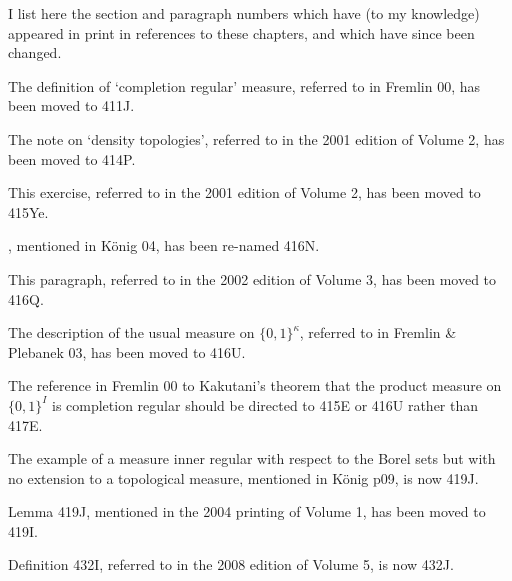      
\def\chaptername{Topologies and measures I}
\def\sectionname{Concordance}
\let\headlinesectionname=\sectionname
     

\medskip
     
I list here the section and paragraph numbers which have 
(to my knowledge) appeared in print in references to these chapters, and 
which have since been changed.
     
\medskip
     
 The definition of `completion regular' 
measure, referred to in {\smc Fremlin 00}, has been moved to 411J.
     
 The note on `density topologies', 
referred to %
in the 2001 edition of Volume 2, has been moved to 414P.

 This exercise, referred to in the 2001 
edition of Volume 2, %
has been moved to 415Ye.

, mentioned in {\smc K\"onig 04}, 
has been re-named 416N.

 This paragraph, 
referred to in the 2002 edition of Volume 3, %
has been moved to 416Q.

 The description of the usual measure 
on $\{0,1\}^{\kappa}$, 
referred to in {\smc Fremlin \& Plebanek 03}, 
has been moved to 416U.

 The reference in
{\smc Fremlin 00} to Kakutani's theorem that the product measure on
$\{0,1\}^I$ is completion regular should be directed to 415E or 416U 
rather than 4{}17E.
     
 The example of a measure inner regular with respect
to the Borel sets but with no extension to a topological measure, mentioned
in {\smc K\"onig p09}, is now 419J.

Lemma 4{}19J, mentioned in the 2004 printing of Volume 1, %
has been moved to 419I.

 Definition 4{}32I, 
referred to in the 2008 edition of Volume 5, is now 432J.

